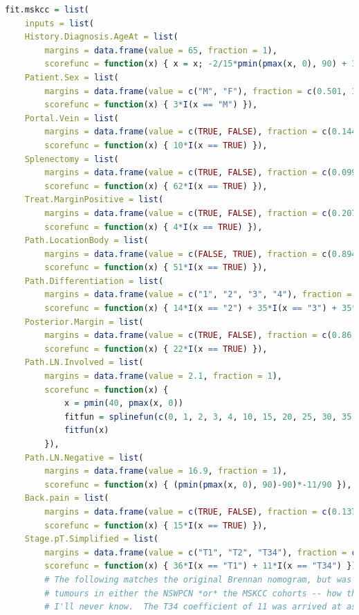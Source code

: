 \begin{lstlisting}[language=R]
fit.mskcc = list(
	inputs = list(
	History.Diagnosis.AgeAt = list(
		margins = data.frame(value = 65, fraction = 1),
		scorefunc = function(x) { x = x; -2/15*pmin(pmax(x, 0), 90) + 12 }),
	Patient.Sex = list(
		margins = data.frame(value = c("M", "F"), fraction = c(0.501, 1-0.501)),
		scorefunc = function(x) { 3*I(x == "M") }),
	Portal.Vein = list(
		margins = data.frame(value = c(TRUE, FALSE), fraction = c(0.144, 1-0.144)),
		scorefunc = function(x) { 10*I(x == TRUE) }),
	Splenectomy = list(
		margins = data.frame(value = c(TRUE, FALSE), fraction = c(0.099, 1-0.099)),
		scorefunc = function(x) { 62*I(x == TRUE) }),
	Treat.MarginPositive = list(
		margins = data.frame(value = c(TRUE, FALSE), fraction = c(0.207, 1-0.207)),
		scorefunc = function(x) { 4*I(x == TRUE) }),
	Path.LocationBody = list(
		margins = data.frame(value = c(FALSE, TRUE), fraction = c(0.894, 1-0.894)),
		scorefunc = function(x) { 51*I(x == TRUE) }),
	Path.Differentiation = list(
		margins = data.frame(value = c("1", "2", "3", "4"), fraction = c(0.142, 0.564, 1-0.142-0.564, 0)),
		scorefunc = function(x) { 14*I(x == "2") + 35*I(x == "3") + 35*I(x == "4") }),		# Undifferentiated (4) not covered by the MSKCC nomogram; here assign the same score as poorly differentiated (3)
	Posterior.Margin = list(
		margins = data.frame(value = c(TRUE, FALSE), fraction = c(0.86, 1-0.86)),
		scorefunc = function(x) { 22*I(x == TRUE) }),
	Path.LN.Involved = list(
		margins = data.frame(value = 2.1, fraction = 1),
		scorefunc = function(x) { 
			x = pmin(40, pmax(x, 0))
			fitfun = splinefun(c(0, 1, 2, 3, 4, 10, 15, 20, 25, 30, 35, 40), c(0, 14.56, 24.64, 30.28, 33.00, 39.05, 43.89, 48.83, 53.77, 58.61, 63.55, 68.49), method = "natural")
			fitfun(x)
		}),
	Path.LN.Negative = list(
		margins = data.frame(value = 16.9, fraction = 1),
		scorefunc = function(x) { (pmin(pmax(x, 0), 90)-90)*-11/90 }),
	Back.pain = list(
		margins = data.frame(value = c(TRUE, FALSE), fraction = c(0.137, 1-0.137)),
		scorefunc = function(x) { 15*I(x == TRUE) }),
	Stage.pT.Simplified = list(
		margins = data.frame(value = c("T1", "T2", "T34"), fraction = c(0.037, 0.119, 1-0.037-0.119)),
		scorefunc = function(x) { 36*I(x == "T1") + 11*I(x == "T34") }),
		# The following matches the original Brennan nomogram, but was not used as there are too few T4
		# tumours in either the NSWPCN *or* the MSKCC cohorts -- how the T4 coefficient was ever estimated,
		# I'll never know.  The T34 coefficient of 11 was arrived at as (0.828*10+(1-0.037-0.119-0.828)*63)/(1-0.037-0.119),

\end{lstlisting}
